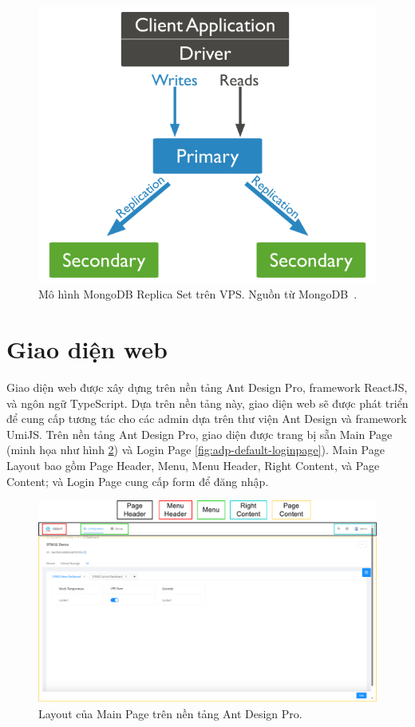 \begin{figure}[htp]
\centering
\includegraphics[width=0.7\linewidth]{images/replica-set-read-write-operations-primary.bakedsvg.png}
\caption{Mô hình MongoDB Replica Set trên VPS. Nguồn từ MongoDB~\cite{Mongo-Replication-Def}.}
\label{fig:MongoDB-Replication-Model}
\end{figure}

\section{Giao diện web}

Giao diện web được xây dựng trên nền tảng Ant Design Pro, framework ReactJS, và ngôn ngữ TypeScript. Dựa trên nền tảng này, giao diện web sẽ được phát triển để cung cấp tương tác cho các admin dựa trên thư viện Ant Design và framework UmiJS.
Trên nền tảng Ant Design Pro, giao diện được trang bị sẵn Main Page (minh họa như hình \ref{fig:adp-default-mainpage}) và Login Page \ref{fig:adp-default-loginpage}). Main Page Layout bao gồm Page Header, Menu, Menu Header, Right Content, và Page Content; và Login Page cung cấp form để đăng nhập.

\begin{figure}[htp]
\centering
\includegraphics[width=1.0\linewidth]{images/Thesis-Page-13-adp-default-mainpage.pdf}
\caption{Layout của Main Page trên nền tảng Ant Design Pro.}
\label{fig:adp-default-mainpage}
\end{figure}

